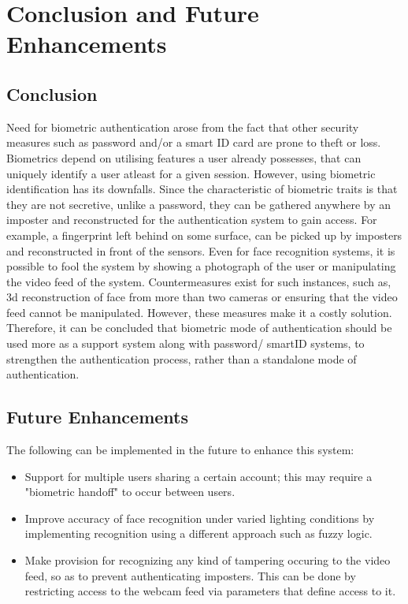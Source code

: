 \documentclass[12pt]{article}			%
\begin{document}
\section{ Conclusion and Future Enhancements }
\subsection {Conclusion}
Need for biometric authentication arose from the fact that other security measures such as password and/or a smart ID card are prone to theft or loss. Biometrics depend on utilising features a user already possesses, that can uniquely identify a user atleast for a given session. However, using biometric identification has its downfalls. Since the characteristic of biometric traits is that they are not secretive, unlike a password, they can be gathered anywhere by an imposter and reconstructed for the authentication system to gain access. For example, a fingerprint left behind on some surface, can be picked up by imposters and reconstructed in front of the sensors. Even for face recognition systems, it is possible to fool the system by showing a photograph of the user or manipulating the video feed of the system. Countermeasures exist for such instances, such as, 3d reconstruction of face from more than two cameras or ensuring that the video feed cannot be manipulated. However, these measures make it a costly solution. Therefore, it can be concluded that biometric mode of authentication should be used more as a support system along with password/ smartID systems, to strengthen the authentication process, rather than a standalone mode of authentication.   

\subsection {Future Enhancements}
The following can be implemented in the future to enhance this system:
\begin{itemize}
\item Support for multiple users sharing a certain account; this may require a "biometric handoff" to occur between users.
\item Improve accuracy of face recognition under varied lighting conditions by implementing recognition using a different approach such as fuzzy logic.
\item Make provision for recognizing any kind of tampering occuring to the video feed, so as to prevent authenticating imposters. This can be done by restricting access to the webcam feed via parameters that define access to it.
\end{itemize}
\end{document}
